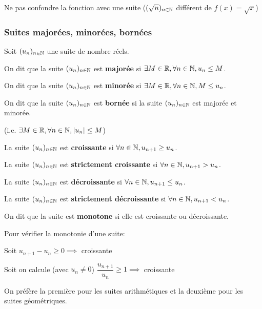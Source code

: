 \documentclass[a4paper, 12pt]{article}
\begin{document}
\begin{remark}
    Ne pas confondre la fonction avec une suite ($(\sqrt{n})_{n \in \mathbb{N}}$ différent de $f(x)= \sqrt{x}$)
\end{remark}

\subsubsection{Suites majorées, minorées, bornées}

\begin{definition}
    Soit $(u_n)_{n \in \mathbb{N}}$ une suite de nombre réels.
    
    \item On dit que la suite $(u_n)_{n \in \mathbb{N}}$ est
    \textbf{majorée} si $\exists M \in \mathbb{R}, \forall n \in \mathbb{N}, u_n \leq M$.
    
    \item On dit que la suite $(u_n)_{n \in \mathbb{N}}$ est
    \textbf{minorée} si $\exists M \in \mathbb{R}, \forall n \in \mathbb{N}, M \leq u_n$.

    \item On dit que la suite $(u_n)_{n \in \mathbb{N}}$ est
    \textbf{bornée} si la suite $(u_n)_{n \in \mathbb{N}}$ est majorée et minorée.\par
    (i.e. $\exists M \in \mathbb{R}, \forall n \in \mathbb{N}, |u_n| \leq M$)
\end{definition}

\begin{definition}
    \item La suite $(u_n)_{n \in \mathbb{N}}$ est \textbf{croissante} si $\forall n \in \mathbb{N}, u_{n+1} \geq  u_n$.
    
    \item La suite $(u_n)_{n \in \mathbb{N}}$ est \textbf{strictement croissante} si $\forall n \in \mathbb{N}, u_{n+1} >  u_n$.
    
    \item La suite $(u_n)_{n \in \mathbb{N}}$ est \textbf{décroissante} si $\forall n \in \mathbb{N}, u_{n+1} \leq  u_n$.

    \item La suite $(u_n)_{n \in \mathbb{N}}$ est \textbf{strictement décroissante} si $\forall n \in \mathbb{N}, u_{n+1} <  u_n$.

    \item On dit que la suite est \textbf{monotone} si elle est croissante ou décroissante.
\end{definition}

\begin{remark}
    Pour vérifier la monotonie d'une suite:

    \item Soit $u_{n+1} - u_n \geq 0 \implies$ croissante
    \item Soit on calcule (avec $u_n \neq 0$) $\dfrac{u_{n+1}}{u_n} \geq 1 \implies$ croissante

    On préfère la première pour les suites arithmétiques et la deuxième pour les suites géométriques.
\end{remark}
\end{document}
